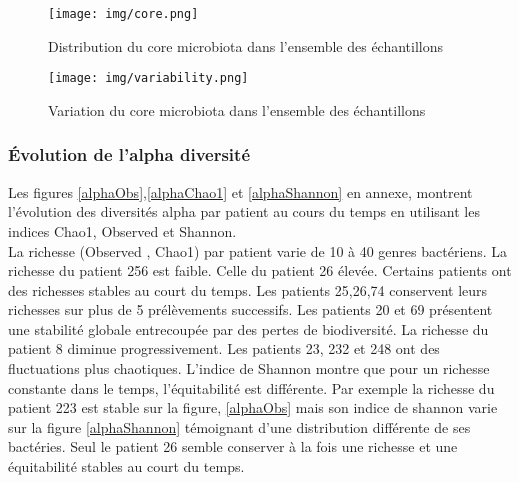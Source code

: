 \documentclass[12pt,a4paper]{article}
\begin{document}
\begin{figure}[t]
\begin{center}
\texttt{[image: img/core.png]}\hfill
\end{center}
\caption{Distribution du core microbiota dans l'ensemble des échantillons}
\label{core}
\end{figure}



\begin{figure}[t]
\begin{center}
\texttt{[image: img/variability.png]}\hfill
\end{center}
\caption{Variation du core microbiota dans l'ensemble des échantillons}
\label{violon}
\end{figure}

\subsubsection{Évolution de l'alpha diversité}
Les figures \ref{alphaObs},\ref{alphaChao1} et \ref{alphaShannon} en annexe, montrent l’évolution des diversités alpha par patient au cours du temps en utilisant les indices Chao1, Observed et Shannon. \\
La richesse (Observed , Chao1) par patient varie de 10 à 40 genres bactériens. La richesse du patient 256 est faible. Celle du patient 26 élevée.
Certains patients ont des richesses stables au court du temps. Les patients 25,26,74 conservent leurs richesses sur plus de 5 prélèvements successifs. Les patients 20 et 69 présentent une stabilité globale entrecoupée par des pertes de biodiversité. La richesse du patient 8 diminue progressivement. Les patients 23, 232 et 248 ont des fluctuations plus chaotiques.
L'indice de Shannon montre que pour un richesse constante dans le temps, l'équitabilité est différente. Par exemple la richesse du patient 223 est stable sur la figure, \ref{alphaObs} mais son indice de shannon varie sur la figure \ref{alphaShannon} témoignant d'une distribution différente de ses bactéries. Seul le patient 26 semble conserver à la fois une richesse et une équitabilité stables au court du temps.
\end{document}

